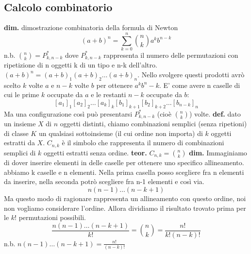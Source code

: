 \subsection*{Calcolo combinatorio}
\textbf{dim.} dimostrazione combinatoria della formula di Newton
\[
    (a+b)^n = \sum_{k=0}^n\binom{n}{k}a^kb^{n-k}
\]
n.b. $\binom{n}{k} = P^{*}_{k,n-k}$ dove $P^*_{k,n-k}$ rappresenta il numero delle permutazioni con ripetizione di n oggetti k di un tipo e n-k dell'altro.\\
$(a+b)^n = (a+b)_1(a+b)_2\dots(a+b)_n$. Nello svolgere questi prodotti avrò scelto $k$ volte $a$ e $n-k$ volte $b$ per ottenere $a^kb^n-k$. E' come avere n caselle di cui le prime $k$ occupate da $a$ e le restanti $n-k$ occupate da $b$:
\[
    [a_1]_1[a_2]_2\dots[a_k]_k[b_1]_{k+1}[b_2]_{k+2}\dots[b_{n-k}]_n
\]
Ma una configurazione così può presentarsi $P^*_{k,n-k}$ (cioè $\binom{n}{k}$) volte.
\newline
\newline
\textbf{def.} dato un insieme $X$ di $n$ oggetti distinti, chiamo combinazioni semplici (senza ripetioni) di classe $K$ un qualsiasi sottoinsieme (il cui ordine non importa) di $k$ oggetti estratti da $X$.\newline
$C_{n,k}$ è il simbolo che rappresenta il numero di combinazioni semplici di $k$ oggetti estratti senza ordine.
\newline
\newline
\textbf{teor.} $C_{n,k} = \binom{n}{k}$
\newline
\textbf{dim.} Immaginiamo di dover inserire elementi in delle caselle per ottenere uno specifico allineamento. abbiamo k caselle e n elementi. Nella prima casella posso scegliere fra n elementi da inserire, nella seconda potrò scegliere fra n-1 elementi e così via. 
\[
    n(n-1)\dots(n-k+1)
\] 
Ma questo modo di ragionare rappresenta un allineamento con questo ordine, noi non vogliamo considerare l'ordine. Allora dividiamo il risultato trovato prima per le $k!$ permutazioni possibili.
\[
    \frac{n(n-1)\dots(n-k+1)}{k!} = \binom{n}{k} = \frac{n!}{k!(n-k)!}
\] 
n.b. $n(n-1)\dots(n-k+1) = \frac{n!}{(n-k)!}$

